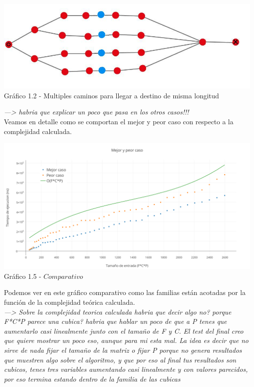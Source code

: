 \vspace*{0.3cm} \vspace*{0.3cm}
  \begin{center}
\includegraphics[scale=0.7]{./EJ1/ej1grafopeorcaso.jpeg}
{Gr\'afico 1.2 - Multiples caminos para llegar a destino de misma longitud}
  \end{center}
  \vspace*{0.3cm}

\textit{---> habria que explicar un poco que pasa en los otros casos!!!}\\

Veamos en detalle como se comportan el mejor y peor caso con respecto a la complejidad calculada.\\

  \vspace*{0.3cm} \vspace*{0.3cm}
  \begin{center}
\includegraphics[scale=0.5]{./EJ1/MejorYPeorCaso.png}
{Gr\'afico 1.5 - $Comparativo$}
  \end{center}
  \vspace*{0.3cm}
  
Podemos ver en este gr\'afico comparativo como las familias est\'an acotadas por la funci\'on de la complejidad te\'orica calculada.\\

\textit{---> Sobre la complejidad teorica calculada habria que decir algo no? porque F*C*P parece una cubica? habria que hablar un poco de que a P tenes que aumentarlo casi linealmente junto con el tamaño de F y C. El test del final creo que quiere mostrar un poco eso, aunque para mi esta mal. La idea es decir que no sirve de nada fijar el tamaño de la matriz o fijar P porque no genera resultados que muestren algo sobre el algoritmo, y que por eso al final tus resultados son cubicos, tenes tres variables aumentando casi linealmente y con valores parecidos, por eso termina estando dentro de la familia de las cubicas}\\

